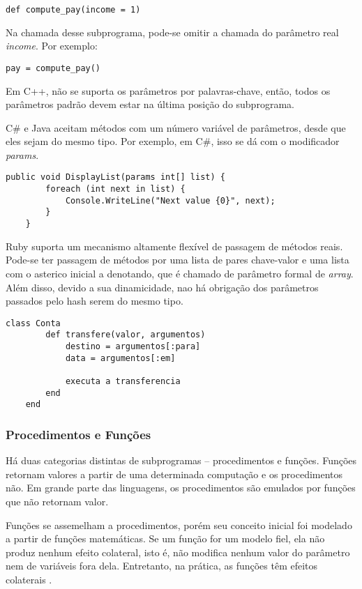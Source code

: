 \begin{verbatim}
def compute_pay(income = 1)
\end{verbatim}

Na chamada desse subprograma, pode-se omitir a chamada do parâmetro real \emph{income}.
Por exemplo:

\begin{verbatim}
pay = compute_pay()
\end{verbatim}

Em C++, não se suporta os parâmetros por palavras-chave, então, 
todos os parâmetros padrão devem estar na última posição do subprograma.

C\# e Java aceitam métodos com um número variável de parâmetros,
desde que eles sejam do mesmo tipo.
Por exemplo, em C\#, isso se dá com o modificador \emph{params}.

\begin{lstlisting}[caption=Código retirado de \cite{sebesta}]
	public void DisplayList(params int[] list) {
		foreach (int next in list) {
			Console.WriteLine("Next value {0}", next);
		}
	}

\end{lstlisting}

Ruby suporta um mecanismo altamente flexível de passagem de métodos reais.
Pode-se ter passagem de métodos por uma lista de pares chave-valor 
e uma lista com o asterico inicial a denotando, que é chamado de 
parâmetro formal de \emph{array}. Além disso,
devido a sua dinamicidade,
nao há obrigação dos parâmetros passados pelo hash serem do mesmo tipo.

\begin{lstlisting}[caption=Código retirado de \cite{caelum}]
	class Conta
  		def transfere(valor, argumentos)
    		destino = argumentos[:para]
    		data = argumentos[:em]

    		executa a transferencia
  		end
	end
\end{lstlisting}

\subsubsection{Procedimentos e Funções} %
\label{ssub:procedimentos_e_fun_es}

Há duas categorias distintas de subprogramas – procedimentos e funções.
Funções retornam valores a partir de uma determinada computação e 
os procedimentos não. 
Em grande parte das linguagens, os procedimentos são emulados por funções que não retornam valor.

Funções se assemelham a procedimentos, porém seu conceito inicial foi modelado a partir de funções matemáticas.
Se um função for um modelo fiel, ela não produz nenhum efeito colateral,
isto é, não modifica nenhum valor do parâmetro nem de variáveis fora dela.
Entretanto, na prática, as funções têm efeitos colaterais \cite{sebesta}.


